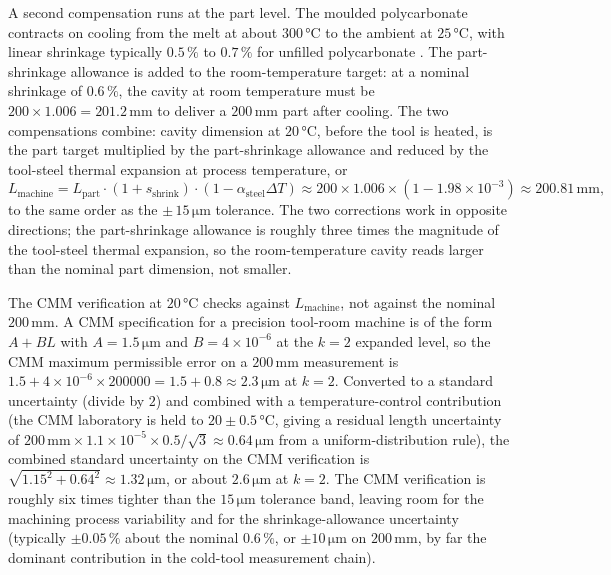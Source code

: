 A second compensation runs at the part level. The moulded
polycarbonate contracts on cooling from the melt at about
$300 \,\si{\degreeCelsius}$ to the ambient at $25 \,\si
{\degreeCelsius}$, with linear shrinkage typically $0.5\,\%$ to
$0.7\,\%$ for unfilled polycarbonate
\cite{ch07t3-text:rosato-injection-molding-2012}. The part-shrinkage
allowance is added to the room-temperature target: at a nominal
shrinkage of $0.6\,\%$, the cavity at room temperature must be
$200 \times 1.006 = 201.2 \,\si{\milli\meter}$ to deliver a
$200 \,\si{\milli\meter}$ part after cooling. The two compensations
combine: cavity dimension at $20 \,\si{\degreeCelsius}$, before the
tool is heated, is the part target multiplied by the part-shrinkage
allowance and reduced by the tool-steel thermal expansion at
process temperature, or
\[
L_{\mathrm{machine}} = L_{\mathrm{part}} \cdot (1 + s_{\mathrm{shrink}})
\cdot (1 - \alpha_{\mathrm{steel}} \Delta T)
\approx 200 \times 1.006 \times (1 - 1.98 \times 10^{-3})
\approx 200.81 \,\si{\milli\meter},
\]
to the same order as the $\pm\,15 \,\si{\micro\meter}$ tolerance.
The two corrections work in opposite directions; the part-shrinkage
allowance is roughly three times the magnitude of the tool-steel
thermal expansion, so the room-temperature cavity reads larger than
the nominal part dimension, not smaller.

The CMM verification at $20 \,\si{\degreeCelsius}$ checks against
$L_{\mathrm{machine}}$, not against the nominal $200 \,\si{\milli
\meter}$. A CMM specification for a precision tool-room machine is
of the form $A + B L$ with $A = 1.5 \,\si{\micro\meter}$ and
$B = 4 \times 10^{-6}$ at the $k = 2$ expanded level, so the CMM
maximum permissible error on a $200 \,\si{\milli\meter}$ measurement
is $1.5 + 4 \times 10^{-6} \times 200000 = 1.5 + 0.8 \approx
2.3 \,\si{\micro\meter}$ at $k = 2$. Converted to a standard
uncertainty (divide by $2$) and combined with a temperature-control
contribution (the CMM laboratory is held to $20 \pm 0.5 \,\si
{\degreeCelsius}$, giving a residual length uncertainty of
$200 \,\si{\milli\meter} \times 1.1 \times 10^{-5} \times
0.5 / \sqrt{3} \approx 0.64 \,\si{\micro\meter}$ from a
uniform-distribution rule), the combined standard uncertainty on
the CMM verification is $\sqrt{1.15^{2} + 0.64^{2}} \approx
1.32 \,\si{\micro\meter}$, or about $2.6 \,\si{\micro\meter}$ at
$k = 2$. The CMM verification is roughly six times tighter than
the $15 \,\si{\micro\meter}$ tolerance band, leaving room for the
machining process variability and for the shrinkage-allowance
uncertainty (typically $\pm 0.05\,\%$ about the nominal $0.6\,\%$,
or $\pm 10 \,\si{\micro\meter}$ on $200 \,\si{\milli\meter}$, by far
the dominant contribution in the cold-tool measurement chain).

